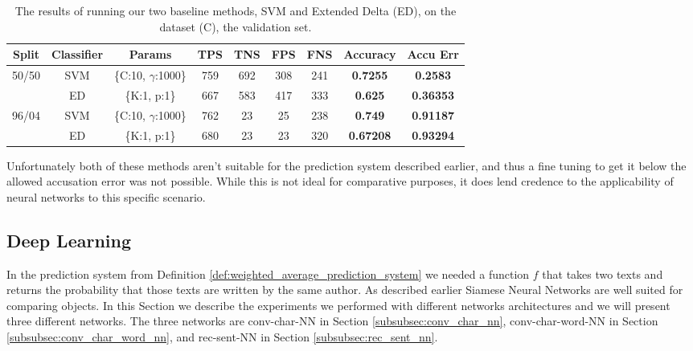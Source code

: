 \begin{table}[h]
\centering
\begin{tabular}{|c|c|c|c|c|c|c||c|c|}
\hline
Split & Classifier & Params & TPS & TNS & FPS & FNS & \textbf{Accuracy} & \textbf{Accu Err} \\ \hline
\multirow{2}{*}{50/50} & SVM & \{C:10, $\gamma$:1000\} &  759 & 692 & 308 & 241 & \textbf{0.7255} & \textbf{0.2583} \\ \cline{2-9} 
 & ED & \{K:1, p:1\} & 667 & 583 & 417 & 333 & \textbf{0.625} & \textbf{0.36353} \\ \hline
\multirow{2}{*}{96/04} & SVM & \{C:10, $\gamma$:1000\} & 762 & 23 & 25 & 238 & \textbf{0.749} & \textbf{0.91187} \\ \cline{2-9} 
 & ED & \{K:1, p:1\} & 680 & 23 & 23 & 320 & \textbf{0.67208} & \textbf{0.93294} \\ \hline
\end{tabular}
\caption{The results of running our two baseline methods, SVM and Extended Delta
(ED), on the dataset (C), the validation set. }
\label{tab:baseline-val-res}
\end{table}

Unfortunately both of these methods aren't suitable for the prediction system
described earlier, and thus a fine tuning to get it below the allowed accusation
error was not possible. While this is not ideal for comparative purposes, it
does lend credence to the applicability of neural networks to this specific
scenario.

\subsection{Deep Learning}

In the prediction system from Definition
\ref{def:weighted_average_prediction_system} we needed a function $f$ that
takes two texts and returns the probability that those texts are written
by the same author. As described earlier Siamese Neural Networks are well
suited for comparing objects. In this Section we describe the experiments
we performed with different networks architectures and we will present
three different networks. The three networks are \gls{conv-char-NN} in
Section \ref{subsubsec:conv_char_nn}, \gls{conv-char-word-NN} in Section
\ref{subsubsec:conv_char_word_nn}, and \gls{rec-sent-NN} in Section
\ref{subsubsec:rec_sent_nn}.

